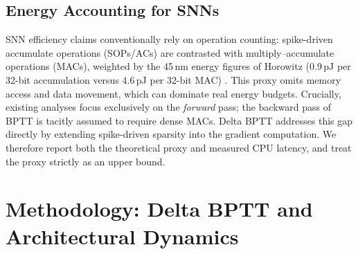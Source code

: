 \documentclass[10pt,journal,compsoc]{IEEEtran}
\begin{document}
\subsection{Energy Accounting for SNNs}
SNN efficiency claims conventionally rely on operation counting: spike-driven accumulate operations (SOPs/ACs) are contrasted with multiply--accumulate operations (MACs), weighted by the 45\,nm energy figures of Horowitz \cite{horowitz2014computing} ($0.9$\,pJ per 32-bit accumulation versus $4.6$\,pJ per 32-bit MAC) \cite{zhou2023spikformer, fang2023spikingjelly}. This proxy omits memory access and data movement, which can dominate real energy budgets. Crucially, existing analyses focus exclusively on the \textit{forward} pass; the backward pass of BPTT is tacitly assumed to require dense MACs. Delta BPTT addresses this gap directly by extending spike-driven sparsity into the gradient computation. We therefore report both the theoretical proxy and measured CPU latency, and treat the proxy strictly as an upper bound.


\section{Methodology: Delta BPTT and Architectural Dynamics}
\end{document}
